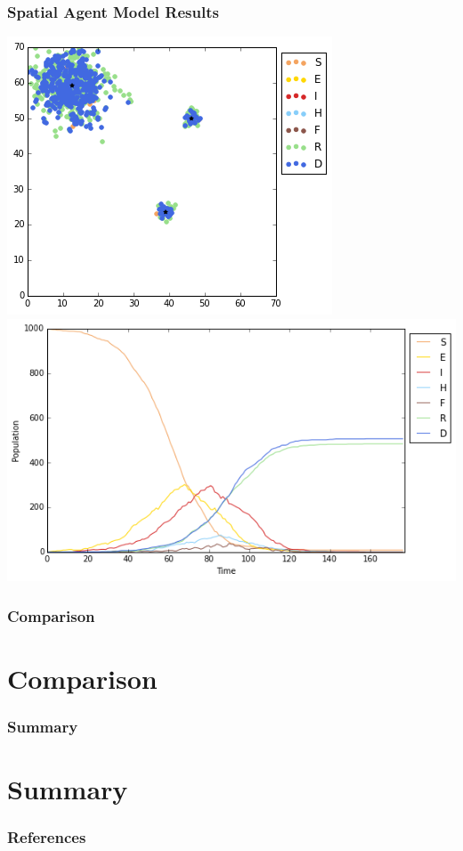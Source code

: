 \documentclass[30pt]{beamer}
\begin{document}
\begin{frame}
\frametitle{Spatial Agent Model Results}
\includegraphics[width=.41\textwidth]{map1}
\includegraphics[width=.59\textwidth]{time1}
\end{frame}

\begin{frame}
\frametitle{Comparison}
\section{Comparison}
\end{frame}

\begin{frame}
\frametitle{Summary}
\section{Summary}
\end{frame}

\begin{frame}
\frametitle{References}


\end{frame}
\end{document}
